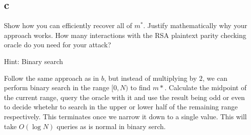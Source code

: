 \documentclass[11pt]{article}
\begin{document}
\subsection{c}

Show how you can eﬃciently recover all of $m^*$. Justify mathematically why your approach works. How many interactions with the RSA plaintext parity checking oracle do you need for your attack?

Hint: Binary search

Follow the same approach as in $b$, but instead of multiplying by $2$, we can perform binary search in the range $[0, N)$ to find $m*$. Calculate the midpoint of the current range, query the oracle with it and use the result being odd or even to decide whetehr to search in the upper or lower half of the remaining range respectively. This terminates once we narrow it down to a single value. This will take $O(\log N)$ queries as is normal in binary serch.
\end{document}
